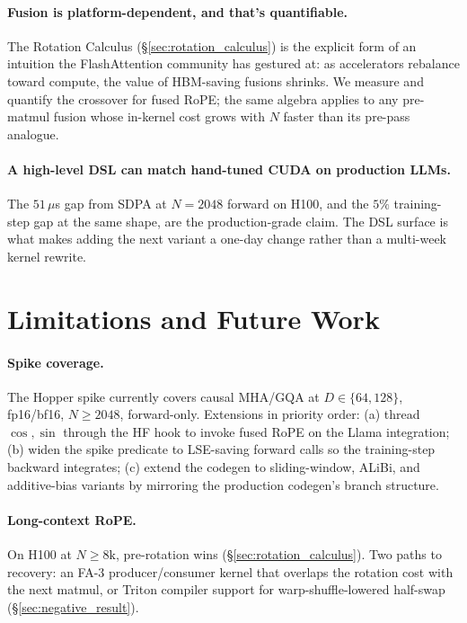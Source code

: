 \documentclass[10pt,twocolumn]{article}
\begin{document}
\paragraph{Fusion is platform-dependent, and that's quantifiable.}
The Rotation Calculus (\S\ref{sec:rotation_calculus}) is the
explicit form of an intuition the FlashAttention community has
gestured at: as accelerators rebalance toward compute, the value of
HBM-saving fusions shrinks. We measure and quantify the crossover
for fused RoPE; the same algebra applies to any pre-matmul fusion
whose in-kernel cost grows with $N$ faster than its pre-pass
analogue.

\paragraph{A high-level DSL can match hand-tuned CUDA on production
LLMs.} The $51\,\mu$s gap from SDPA at $N{=}2048$ forward on H100,
and the $5\%$ training-step gap at the same shape, are the
production-grade claim. The DSL surface is what makes adding the
next variant a one-day change rather than a multi-week kernel
rewrite.

\section{Limitations and Future Work}
\label{sec:limitations}

\paragraph{Spike coverage.} The Hopper spike currently covers
causal MHA/GQA at $D \in \{64, 128\}$, fp16/bf16, $N \geq 2048$,
forward-only. Extensions in priority order: (a) thread $\cos, \sin$
through the HF hook to invoke fused RoPE on the Llama integration;
(b) widen the spike predicate to LSE-saving forward calls so the
training-step backward integrates; (c) extend the codegen to
sliding-window, ALiBi, and additive-bias variants by mirroring the
production codegen's branch structure.

\paragraph{Long-context RoPE.} On H100 at $N \geq 8\text{k}$,
pre-rotation wins (\S\ref{sec:rotation_calculus}). Two paths to
recovery: an FA-3 producer/consumer kernel that overlaps the
rotation cost with the next matmul, or Triton compiler support for
warp-shuffle-lowered half-swap (\S\ref{sec:negative_result}).
\end{document}
